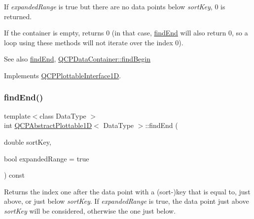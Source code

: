 If {\itshape expanded\+Range} is true but there are no data points below {\itshape sort\+Key}, 0 is returned.

If the container is empty, returns 0 (in that case, \hyperlink{class_q_c_p_abstract_plottable1_d_ad913df7f02add35150779dce3913aeae}{find\+End} will also return 0, so a loop using these methods will not iterate over the index 0).

\begin{DoxySeeAlso}{See also}
\hyperlink{class_q_c_p_abstract_plottable1_d_ad913df7f02add35150779dce3913aeae}{find\+End}, \hyperlink{class_q_c_p_data_container_a2ad8a5399072d99a242d3a6d2d7e278a}{Q\+C\+P\+Data\+Container\+::find\+Begin} 
\end{DoxySeeAlso}


Implements \hyperlink{class_q_c_p_plottable_interface1_d_a5b95783271306a4de97be54eac1e7d13}{Q\+C\+P\+Plottable\+Interface1D}.

\mbox{\label{class_q_c_p_abstract_plottable1_d_ad913df7f02add35150779dce3913aeae}} 
\subsubsection{\texorpdfstring{find\+End()}{findEnd()}\hspace{0.1cm}{\footnotesize\ttfamily [1/2]}}
{\footnotesize\ttfamily template$<$class Data\+Type $>$ \\
int \hyperlink{class_q_c_p_abstract_plottable1_d}{Q\+C\+P\+Abstract\+Plottable1D}$<$ Data\+Type $>$\+::find\+End (\begin{DoxyParamCaption}\item[{double}]{sort\+Key,  }\item[{bool}]{expanded\+Range = {\ttfamily true} }\end{DoxyParamCaption}) const\hspace{0.3cm}{\ttfamily [virtual]}}





Returns the index one after the data point with a (sort-\/)key that is equal to, just above, or just below {\itshape sort\+Key}. If {\itshape expanded\+Range} is true, the data point just above {\itshape sort\+Key} will be considered, otherwise the one just below.

